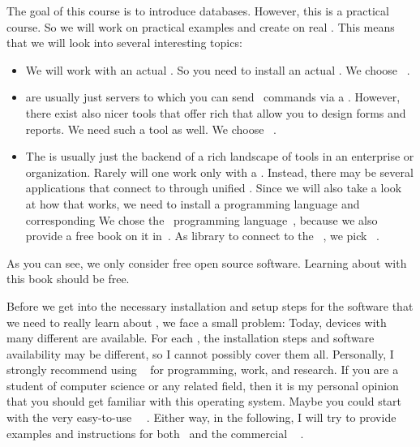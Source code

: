 %
%
%
The goal of this course is to introduce databases.
However, this is a practical course.
So we will work on practical examples and create   on real .
This means that we will look into several interesting topics:%
%
\begin{itemize}%
%
\item We will work with an actual . %
So you need to install an actual . %
We choose \postgresql~\cite{TA2024DDAMWPAM,FP2023LP,OH2017PUAR,B2024PELUYDW}.%
%
\item {} are usually just servers to which you can send \sql\ commands via a  . %
However, there exist also nicer tools that offer rich  that allow you to design forms and reports. %
We need such a tool as well. %
We choose \libreofficeBase~\cite{FNFHWSKLSSGLFRSRPLJG2022BG7R1BOL7C,S2022L7PFEUU}.%
%
\item The  is usually just the backend of a rich landscape of tools in an enterprise or organization. %
Rarely will one work only with a . %
Instead, there may be several applications that connect to  through unified . %
Since we will also take a look at how that works, we need to install a programming language and corresponding  %
We chose the \python\ programming language~\cite{K2018EIPFEUU,A2002PC,H2023ABGTP3P,LH2015DSAAWP}, because we also provide a free book on it in~\cite{programmingWithPython}. %
As library to connect to the \postgresql\ , we pick \psycopg~\cite{VDGE2010P}.%
%
\end{itemize}%
%
As you can see, we only consider free open source software.
Learning about  with this book should be free.

Before we get into the necessary installation and setup steps for the software that we need to really learn about , we face a small problem:
Today, devices with many different  are available.
For each , the installation steps and software availability may be different, so I cannot possibly cover them all.
Personally, I strongly recommend using \linux~\cite{T1999TLE,B2022ELATCL,H2022LML} for programming, work, and research.
If you are a student of computer science or any related field, then it is my personal opinion that you should get familiar with this operating system.
Maybe you could start with the very easy-to-use \ubuntu\ \linux~\cite{CN2020ULB,H2020ULU2E}.
Either way, in the following, I will try to provide examples and instructions for both \ubuntu\ and the commercial \microsoftWindows~\cite{B2023W1IO} .%
%
%
%
%
%
\endhsection%
%
